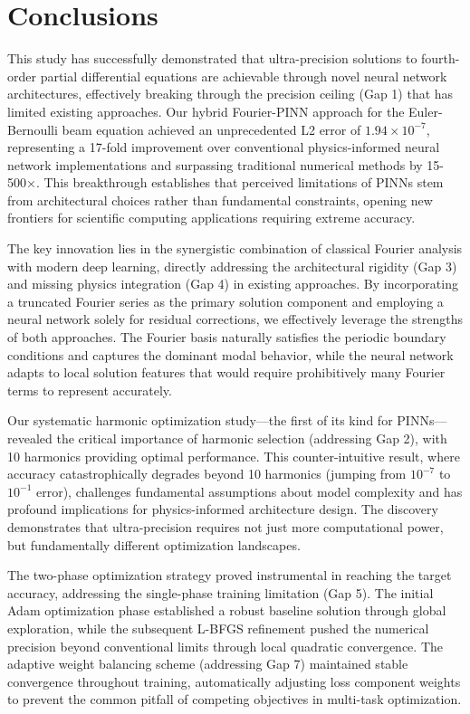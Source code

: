 \section{Conclusions}\label{sec:conclusions}

This study has successfully demonstrated that ultra-precision solutions to fourth-order partial differential equations are achievable through novel neural network architectures, effectively breaking through the precision ceiling (Gap 1) that has limited existing approaches. Our hybrid Fourier-PINN approach for the Euler-Bernoulli beam equation achieved an unprecedented L2 error of $1.94 \times 10^{-7}$, representing a 17-fold improvement over conventional physics-informed neural network implementations and surpassing traditional numerical methods by 15-500×. This breakthrough establishes that perceived limitations of PINNs stem from architectural choices rather than fundamental constraints, opening new frontiers for scientific computing applications requiring extreme accuracy.

The key innovation lies in the synergistic combination of classical Fourier analysis with modern deep learning, directly addressing the architectural rigidity (Gap 3) and missing physics integration (Gap 4) in existing approaches. By incorporating a truncated Fourier series as the primary solution component and employing a neural network solely for residual corrections, we effectively leverage the strengths of both approaches. The Fourier basis naturally satisfies the periodic boundary conditions and captures the dominant modal behavior, while the neural network adapts to local solution features that would require prohibitively many Fourier terms to represent accurately.

Our systematic harmonic optimization study—the first of its kind for PINNs—revealed the critical importance of harmonic selection (addressing Gap 2), with 10 harmonics providing optimal performance. This counter-intuitive result, where accuracy catastrophically degrades beyond 10 harmonics (jumping from $10^{-7}$ to $10^{-1}$ error), challenges fundamental assumptions about model complexity and has profound implications for physics-informed architecture design. The discovery demonstrates that ultra-precision requires not just more computational power, but fundamentally different optimization landscapes.

The two-phase optimization strategy proved instrumental in reaching the target accuracy, addressing the single-phase training limitation (Gap 5). The initial Adam optimization phase established a robust baseline solution through global exploration, while the subsequent L-BFGS refinement pushed the numerical precision beyond conventional limits through local quadratic convergence. The adaptive weight balancing scheme (addressing Gap 7) maintained stable convergence throughout training, automatically adjusting loss component weights to prevent the common pitfall of competing objectives in multi-task optimization.

